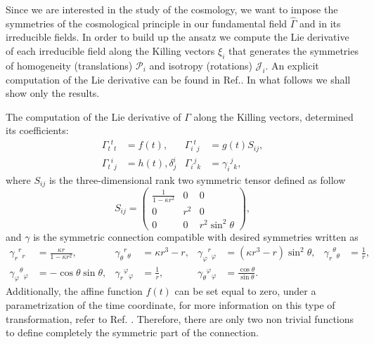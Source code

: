 \documentclass{article}
\providecommand{\ctG}[3]{\Gamma_{#1}{}^{ #2}{}_{#3}}
\providecommand{\ctg}[3]{\gamma_{#1}{}^{ #2}{}_{#3}}
\begin{document}
Since we are interested in the study of the cosmology, we want to impose the symmetries of the cosmological principle in 
our fundamental field $\hat{\Gamma}$ and in its irreducible fields. In order to build up the ansatz we compute the Lie
derivative of each irreducible field along the Killing vectors $\xi_i$ that generates the symmetries of homogeneity 
(translations) $\mathcal{P}_i$ and isotropy (rotations) $\mathcal{J}_i$. An explicit computation of the Lie derivative
can be found in Ref.\cite{Castillo-Felisola17}. In what follows we shall show only the results.

The computation of the Lie derivative of $\Gamma$ along the Killing vectors, determined its coefficients: 
\begin{align}
    \label{G_ansatz}
    \ctG{t}{t}{t} & =f(t), & \ctG{i}{t}{j} & = g(t) S_{i j}, \\
    \ctG{t}{i}{j} &= h(t), \delta^{i}_{j} & \ctG{i}{j}{k} & = \ctg{i}{j}{k},
\end{align}
where $S_{ij}$ is the three-dimensional rank two symmetric tensor defined as follow
\begin{equation}
    S_{i j}=\left(\begin{array}{ccc}
    \frac{1}{1-\kappa r^2} & 0 & 0 \\
    0 & r^2 & 0 \\
    0 & 0 & r^2 \sin ^2 \theta
    \end{array}\right),
\end{equation}
and $\gamma$ is the symmetric connection compatible with desired symmetries written as
\begin{align}
    \ctg{r}{r}{r} & = \frac{\kappa r}{1 - \kappa r^2}, & \ctg{\theta}{r}{\theta} & = \kappa r^3 - r, &
    \ctg{\varphi}{r}{\varphi} & = \left(\kappa r^3 - r\right)\sin^2\theta, & \ctg{r}{\theta}{\theta} & = \frac{1}{r}, \\
    \ctg{\varphi}{\theta}{\varphi} & = -\cos\theta\sin\theta, & \ctg{r}{\varphi}{\varphi} & = \frac{1}{r}, & 
    \ctg{\theta}{\varphi}{\varphi} & = \frac{\cos \theta}{\sin \theta}.
\end{align}
Additionally, the affine function $f(t)$ can be set equal to zero, under a parametrization of the time coordinate, for more information
on this type of transformation, refer to Ref. \cite{Castillo_Felisola_2022_EPJC}. Therefore, there are only two non trivial functions
to define completely the symmetric part of the connection.
\end{document}
